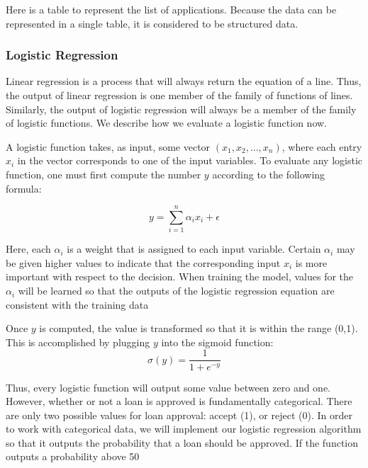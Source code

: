 \par Here is a table to represent the list of applications. Because the data can be represented in a single table, it is considered to be structured data.
\begin{visualComponent}
\end{visualComponent}




\subsubsection{Logistic Regression}

\par Linear regression is a process that will always return the equation of a line. Thus, the output of linear regression is one member of the family of functions of lines. Similarly, the output of logistic regression will always be a member of the family of logistic functions. We describe how we evaluate a logistic function now.
\par A logistic function takes, as input, some vector $(x_1,x_2,\ldots,x_n)$, where each entry $x_i$ in the vector corresponds to one of the input variables. To evaluate any logistic function, one must first compute the number $y$ according to the following formula:

$$ y = \sum_{i=1}^n \alpha_i x_i + \epsilon $$
\par Here, each $\alpha_i$ is a weight that is assigned to each input variable. Certain $\alpha_i$ may be given higher values to indicate that the corresponding input $x_i$ is more important with respect to the decision. When training the model, values for the $\alpha_i$ will be learned so that the outputs of the logistic regression equation are consistent with the training data
\par Once $y$ is computed, the value is transformed so that it is within the range (0,1). This is accomplished by plugging $y$ into the sigmoid function:
$$ \sigma(y) = \frac{1}{1+e^{-y}} $$

\par Thus, every logistic function will output some value between zero and one. However, whether or not a loan is approved is fundamentally categorical. There are only two possible values for loan approval: accept (1), or reject (0). In order to work with categorical data, we will implement our logistic regression algorithm so that it outputs the probability that a loan should be approved. If the function outputs a probability above 50%



